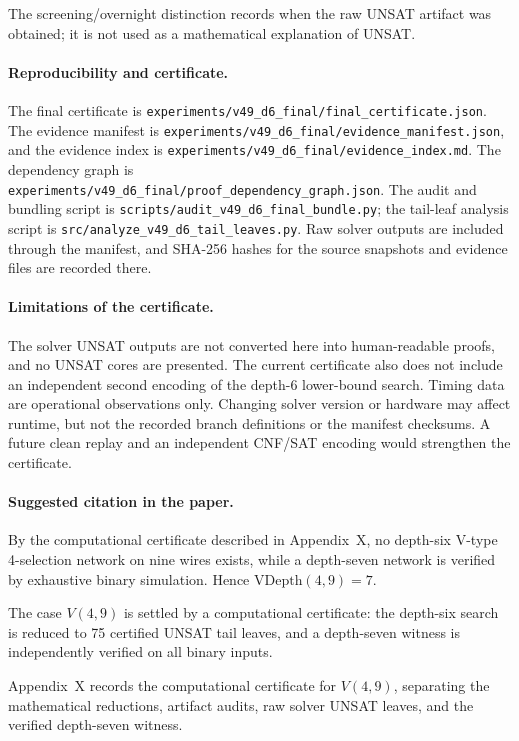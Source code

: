 The screening/overnight distinction records when the raw UNSAT artifact was
obtained; it is not used as a mathematical explanation of UNSAT.

\paragraph{Reproducibility and certificate.}
The final certificate is
\texttt{experiments/v49\_d6\_final/final\_certificate.json}. The evidence
manifest is \texttt{experiments/v49\_d6\_final/evidence\_manifest.json}, and
the evidence index is
\texttt{experiments/v49\_d6\_final/evidence\_index.md}. The dependency graph is
\texttt{experiments/v49\_d6\_final/proof\_dependency\_graph.json}. The audit
and bundling script is \texttt{scripts/audit\_v49\_d6\_final\_bundle.py}; the
tail-leaf analysis script is \texttt{src/analyze\_v49\_d6\_tail\_leaves.py}.
Raw solver outputs are included through the manifest, and SHA-256 hashes for
the source snapshots and evidence files are recorded there.

\paragraph{Limitations of the certificate.}
The solver UNSAT outputs are not converted here into human-readable proofs, and
no UNSAT cores are presented. The current certificate also does not include an
independent second encoding of the depth-6 lower-bound search. Timing data are
operational observations only. Changing solver version or hardware may affect
runtime, but not the recorded branch definitions or the manifest checksums. A
future clean replay and an independent CNF/SAT encoding would strengthen the
certificate.

\paragraph{Suggested citation in the paper.}
By the computational certificate described in Appendix~X, no depth-six V-type
4-selection network on nine wires exists, while a depth-seven network is
verified by exhaustive binary simulation. Hence \(\mathrm{VDepth}(4,9)=7\).

The case \(V(4,9)\) is settled by a computational certificate: the depth-six
search is reduced to 75 certified UNSAT tail leaves, and a depth-seven witness
is independently verified on all binary inputs.

Appendix~X records the computational certificate for \(V(4,9)\), separating the
mathematical reductions, artifact audits, raw solver UNSAT leaves, and the
verified depth-seven witness.

